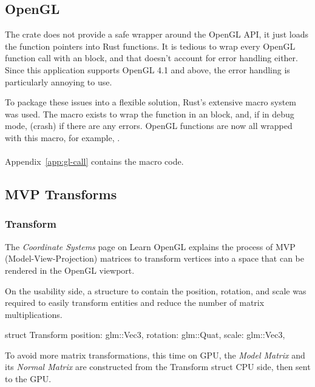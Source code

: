 \subsection{OpenGL}

The  crate does not provide a safe wrapper around the OpenGL API, it just loads the function pointers into Rust functions.
It is tedious to wrap every OpenGL function call with an  block, and that doesn't account for error handling either.
Since this application supports OpenGL 4.1 and above, the error handling is particularly annoying to use.

To package these issues into a flexible solution, Rust's extensive macro system was used.
The  macro exists to wrap the function in an  block, and, if in debug mode,  (crash) if there are any errors.
OpenGL functions are now all wrapped with this macro, for example, .
\\
\\
Appendix~\ref{app:gl-call} contains the macro code.

\subsection{MVP Transforms}

\subsubsection{Transform}
The \emph{Coordinate Systems} page on Learn OpenGL\autocite{de_vries_learn_2020} explains the process of MVP (Model-View-Projection) matrices to transform vertices into a space that can be rendered in the OpenGL viewport.

On the usability side, a structure to contain the position, rotation, and scale was required to easily transform entities and reduce the number of matrix multiplications.
  \begin{rustcode}
struct Transform {
    position: glm::Vec3,
    rotation: glm::Quat,
    scale: glm::Vec3,
}
  \end{rustcode}
To avoid more matrix transformations, this time on GPU, the \emph{Model Matrix} and its \emph{Normal Matrix} are constructed from the Transform struct CPU side, then sent to the GPU\@.

